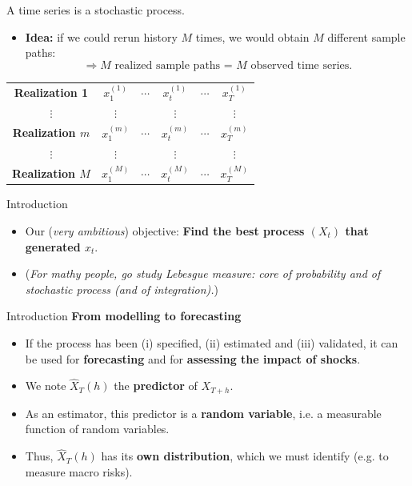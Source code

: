 \documentclass{beamer}
\begin{document}
\begin{frame}{A time series is a stochastic process.}
\small
\begin{itemize}
    \[
    (X_t)_{t=1,\ldots,T}, \quad \text{referred to as the \textbf{stochastic process}.}
    \]
    \vspace{0.2cm}
    \item \textbf{Idea:} if we could rerun history $M$ times, we would obtain $M$ different sample paths:
    \[
    \Rightarrow \text{$M$ realized sample paths = $M$ observed time series.}
    \]
\end{itemize}

\vspace{0.4cm}
\centering
\begin{tabular}{cccccc}
\textbf{Realization 1} & $x_1^{(1)}$ & $\cdots$ & $x_t^{(1)}$ & $\cdots$ & $x_T^{(1)}$ \\
$\vdots$ & $\vdots$ & & $\vdots$ & & $\vdots$ \\
\textbf{Realization $m$} & $x_1^{(m)}$ & $\cdots$ & $x_t^{(m)}$ & $\cdots$ & $x_T^{(m)}$ \\
$\vdots$ & $\vdots$ & & $\vdots$ & & $\vdots$ \\
\textbf{Realization $M$} & $x_1^{(M)}$ & $\cdots$ & $x_t^{(M)}$ & $\cdots$ & $x_T^{(M)}$ \\
\end{tabular}
\end{frame}


\begin{frame}{Introduction}
\begin{itemize}
  \item Our (\textit{very ambitious}) objective: \textbf{Find the best process $(X_t)$ that generated $x_t$}.
  \item (\textit{For mathy people, go study Lebesgue measure: core of probability and of stochastic process (and of integration).})
\end{itemize}
\end{frame}

\begin{frame}{Introduction}
\textbf{From modelling to forecasting}
\begin{itemize}
  \item If the process has been (i) specified, (ii) estimated and (iii) validated, it can be used for \textbf{forecasting} and for \textbf{assessing the impact of shocks}.
  \item We note $\hat X_T(h)$ the \textbf{predictor} of $X_{T+h}$.
  \item As an estimator, this predictor is a \textbf{random variable}, i.e. a measurable function of random variables.
  \item Thus, $\hat X_T(h)$ has its \textbf{own distribution}, which we must identify (e.g. to measure macro risks).
\end{itemize}
\end{frame}
\end{document}
